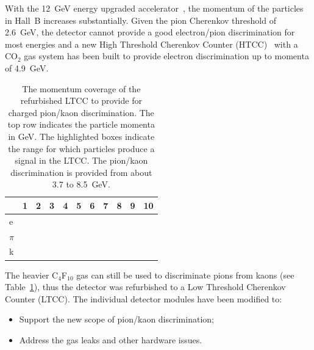 With the 12~GeV energy upgraded accelerator~\cite{TDR12}, the momentum of the particles in Hall~B increases
substantially. Given the pion Cherenkov threshold of 2.6~GeV, the detector cannot provide a good electron/pion
discrimination for most energies and a new High Threshold Cherenkov Counter (HTCC)~\cite{htcc-nim} with a
CO$_2$ gas system has been built to provide electron discrimination up to momenta of 4.9~GeV.

\begin{table}[h]
    \small
	\begin{center}
        \begin{tabular}{ | p{5mm} | p{2.5mm} | p{2.5mm} | p{2.5mm} | p{2.5mm} | p{2.5mm} | p{2.5mm} | p{2.5mm} | p{2.5mm} | p{2.5mm} |p{2.5mm} |}
			\hline \hline
			 & 1 & 2 & 3 & 4 & 5 & 6 & 7 & 8 & 9 & 10      \\
			\hline
             e  & \cellcolor{grey} & \cellcolor{grey} & \cellcolor{grey}
                & \cellcolor{grey} & \cellcolor{grey} & \cellcolor{grey}
                & \cellcolor{grey} & \cellcolor{grey} & \cellcolor{grey} & \cellcolor{grey}  \\
         $\pi$  &  &  &
                & \cellcolor{grey} & \cellcolor{grey} & \cellcolor{grey}
                & \cellcolor{grey} & \cellcolor{grey} & \cellcolor{grey} & \cellcolor{grey}  \\
             k  & & & & & & &
                & \cellcolor{grey} & \cellcolor{grey} & \cellcolor{grey} \\
			\hline \hline
		\end{tabular}
	\end{center}
	\caption{The momentum coverage of the refurbished LTCC to provide for charged pion/kaon discrimination.
        The top row indicates the particle momenta in GeV. The highlighted boxes indicate the range for which particles
        produce a signal in the LTCC. The pion/kaon discrimination is provided from about 3.7 to 8.5~GeV.}
        \label{tab:newScope}
\end{table}

The heavier C$_4$F$_{10}$ gas can still be used to discriminate pions from kaons (see Table~\ref{tab:newScope}),
thus the detector was refurbished to a Low Threshold Cherenkov Counter (LTCC). The individual detector modules
have been modified to:

\begin{itemize}
	\item Support the new scope of pion/kaon discrimination;
	\item Address the gas leaks and other hardware issues.
\end{itemize}
